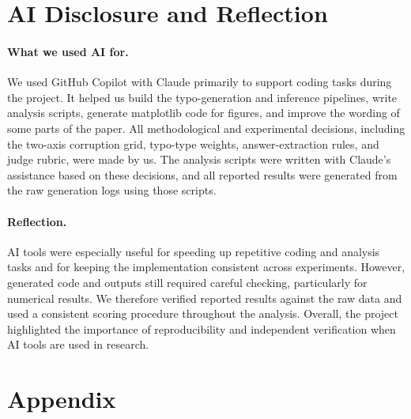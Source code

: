 \documentclass[11pt]{article}
\begin{document}
\section*{AI Disclosure and Reflection}

\paragraph{What we used AI for.}
We used GitHub Copilot with Claude primarily to support coding tasks during the
project. It helped us build the typo-generation and inference pipelines, write
analysis scripts, generate matplotlib code for figures, and improve the wording
of some parts of the paper. All methodological and experimental decisions,
including the two-axis corruption grid, typo-type weights, answer-extraction
rules, and judge rubric, were made by us. The analysis scripts were written with
Claude's assistance based on these decisions, and all reported results were
generated from the raw generation logs using those scripts.

\paragraph{Reflection.}
AI tools were especially useful for speeding up repetitive coding and analysis
tasks and for keeping the implementation consistent across experiments. However,
generated code and outputs still required careful checking, particularly for
numerical results. We therefore verified reported results against the raw data
and used a consistent scoring procedure throughout the analysis. Overall, the
project highlighted the importance of reproducibility and independent
verification when AI tools are used in research.




\appendix
\clearpage
\onecolumn
\raggedbottom
\section*{Appendix}
\vspace{0.5em}
\renewcommand{\thetable}{A\arabic{table}}
\setcounter{table}{0}
\setlength{\tabcolsep}{2.6pt}

\end{document}
